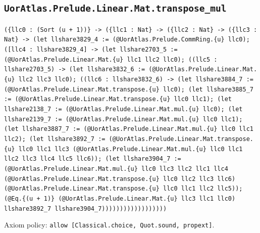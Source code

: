 \documentclass[11pt]{article}
\begin{document}
\subsection*{\texttt{UorAtlas.Prelude.Linear.Mat.transpose\_mul}}
\noindent\texttt{(\{llc0 : (Sort (u + 1))\} -> (\{llc1 : Nat\} -> (\{llc2 : Nat\} -> (\{llc3 : Nat\} -> (let llshare3829\_4 := (@UorAtlas.Prelude.CommRing.\{u\} llc0); ([llc4 : llshare3829\_4] -> (let llshare2703\_5 := (@UorAtlas.Prelude.Linear.Mat.\{u\} llc1 llc2 llc0); ((llc5 : llshare2703\_5) -> (let llshare3832\_6 := (@UorAtlas.Prelude.Linear.Mat.\{u\} llc2 llc3 llc0); ((llc6 : llshare3832\_6) -> (let llshare3884\_7 := (@UorAtlas.Prelude.Linear.Mat.transpose.\{u\} llc0); (let llshare3885\_7 := (@UorAtlas.Prelude.Linear.Mat.transpose.\{u\} llc0 llc1); (let llshare2138\_7 := (@UorAtlas.Prelude.Linear.Mat.mul.\{u\} llc0); (let llshare2139\_7 := (@UorAtlas.Prelude.Linear.Mat.mul.\{u\} llc0 llc1); (let llshare3887\_7 := (@UorAtlas.Prelude.Linear.Mat.mul.\{u\} llc0 llc1 llc2); (let llshare3892\_7 := (@UorAtlas.Prelude.Linear.Mat.transpose.\{u\} llc0 llc1 llc3 (@UorAtlas.Prelude.Linear.Mat.mul.\{u\} llc0 llc1 llc2 llc3 llc4 llc5 llc6)); (let llshare3904\_7 := (@UorAtlas.Prelude.Linear.Mat.mul.\{u\} llc0 llc3 llc2 llc1 llc4 (@UorAtlas.Prelude.Linear.Mat.transpose.\{u\} llc0 llc2 llc3 llc6) (@UorAtlas.Prelude.Linear.Mat.transpose.\{u\} llc0 llc1 llc2 llc5)); (@Eq.\{(u + 1)\} (@UorAtlas.Prelude.Linear.Mat.\{u\} llc3 llc1 llc0) llshare3892\_7 llshare3904\_7))))))))))))))))))}\par
\noindent Axiom policy: \texttt{allow [Classical.choice, Quot.sound, propext]}.\par
\end{document}
